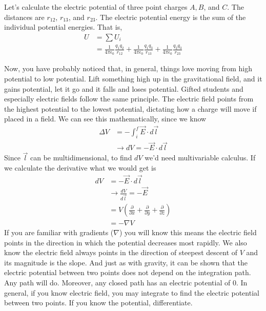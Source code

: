 \documentclass[nobib]{tufte-handout}
\begin{document}
Let's calculate the electric potential of three point charges $A,B$, and $C$.
The distances are $r_{12}$, $r_{13}$, and $r_{23}$. The electric potential energy is 
the sum of the individual potential energies. That is, 
\begin{align*}
    U &= \sum U_i \\
    &= \frac{1}{4\pi \epsilon_0}\frac{q_1 q_2}{r_{12}} + \frac{1}{4\pi \epsilon_0}\frac{q_1 q_3}{r_{13}} + \frac{1}{4\pi \epsilon_0}\frac{q_2 q_3}{r_{23}}
\end{align*}

Now, you have probably noticed that, in general, things love moving from high potential to 
low potential. Lift something high up in the gravitational field, and it gains potential, let it go
and it falls and loses potential. Gifted students and especially electric fields follow the same 
principle. The electric field points from the highest potential to the lowest potential, 
dictating how a charge will move if placed in a field. We can see this mathematically, 
since we know 
\begin{align*}
    \Delta V &= -\int_{i}^{f} \vec{E} \cdot d\vec{l} \\
    &\rightarrow dV = -\vec{E}\cdot d\vec{l}
\end{align*}
Since $\vec{l}$ can be multidimensional, to find $dV$ we'd need multivariable calculus. 
If we calculate the derivative what we would get is 
\begin{align*}
    dV &= -\vec{E}\cdot d\vec{l} \\
    &\rightarrow \frac{dV}{d\vec{l}} = -\vec{E} \\
    &= V\left( \frac{\partial}{\partial x} + \frac{\partial}{\partial y} + \frac{\partial}{\partial z} \right) \\
    &= -\nabla V
\end{align*}
If you are familiar with gradients ($\nabla$) you will know this means
the electric field points in the direction in which the potential decreases most rapidly. 
We also know the electric field always points in the direction of
steepest descent of $V$ and its
magnitude is the slope. And just as with gravity, it can be shown that the 
electric potential between two points does not
depend on the integration path. Any path will do. Moreover, any closed path 
has an electric potential of 0. 
In general, if you know electric field, you may integrate to find 
the electric potential between two points. If you know the potential, 
differentiate. 
\end{document}
